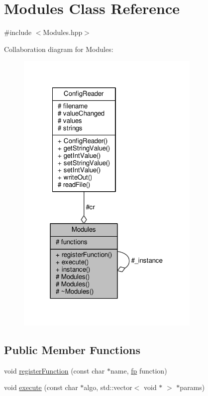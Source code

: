 \hypertarget{class_modules}{}\section{Modules Class Reference}
\label{class_modules}


{\ttfamily \#include $<$Modules.\+hpp$>$}



Collaboration diagram for Modules\+:\nopagebreak
\begin{figure}[H]
\begin{center}
\leavevmode
\includegraphics[width=250pt]{class_modules__coll__graph}
\end{center}
\end{figure}
\subsection*{Public Member Functions}
\begin{DoxyCompactItemize}
\item 
void \hyperlink{class_modules_a01735870f0eb88e2847a822be229f927}{register\+Function} (const char $\ast$name, \hyperlink{_modules_8hpp_ab9dff9a0870eba3247a74a386629294f}{fp} function)
\item 
void \hyperlink{class_modules_a37a7813533ef4fdce805609ace458207}{execute} (const char $\ast$algo, std\+::vector$<$ void $\ast$ $>$ $\ast$params)
\end{DoxyCompactItemize}

